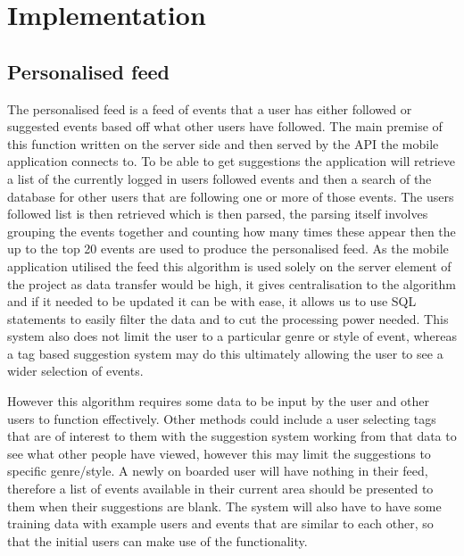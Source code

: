 \chapter{Implementation}

	\section{Personalised feed}
		The personalised feed is a feed of events that a user has either followed or suggested events based off what other users have followed. The main premise of this function written on the server side and then served by the API the mobile application connects to. To be able to get suggestions the application will retrieve a list of the currently logged in users followed events and then a search of the database for other users that are following one or more of those events. The users followed list is then retrieved which is then parsed, the parsing itself involves grouping the events together and counting how many times these appear then the up to the top 20 events are used to produce the personalised feed. As the mobile application utilised the feed this algorithm is used solely on the server element of the project as data transfer would be high, it gives centralisation to the algorithm and if it needed to be updated it can be with ease, it allows us to use SQL statements to easily filter the data and to cut the processing power needed. This system also does not limit the user to a particular genre or style of event, whereas a tag based suggestion system may do this ultimately allowing the user to see a wider selection of events. 

		However this algorithm requires some data to be input by the user and other users to function effectively. Other methods could include a user selecting tags that are of interest to them with the suggestion system working from that data to see what other people have viewed, however this may limit the suggestions to  specific genre/style. A  newly on boarded user will have nothing in their feed, therefore a list of events available in their current area should be presented to them when their suggestions are blank. The system will also have to have some training data with example users and events that are similar to each other, so that the initial users can make use of the functionality. 

